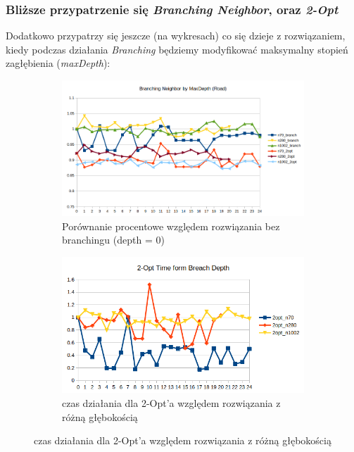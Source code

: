 \documentclass{article}
\begin{document}
\subsubsection{Bliższe przypatrzenie się \textit{Branching Neighbor}, oraz \textit{2-Opt}}
Dodatkowo przypatrzy się jeszcze (na wykresach) co się dzieje z rozwiązaniem, kiedy podczas działania \textit{Branching} będziemy modyfikować maksymalny stopień zagłębienia (\textit{maxDepth}):
\begin{figure}[h!]
 	\centering
 	\begin{subfigure}[b]{1\linewidth}
    	\includegraphics[width=\linewidth]{branch_roads_perc.png}
    	\caption{Porównanie procentowe względem rozwiązania bez branchingu (depth = 0)}
	\end{subfigure}
 	\begin{subfigure}[b]{1\linewidth}
    	\includegraphics[width=\linewidth]{branch_times_2Opt.png}
    	\caption{czas działania dla 2-Opt'a względem rozwiązania z różną głębokością}
	\end{subfigure}
\end{figure}
\end{document}
